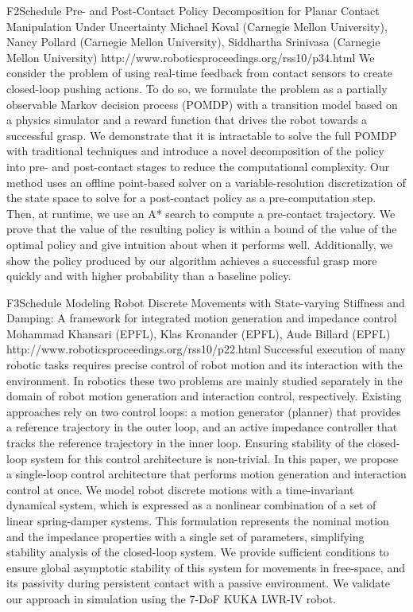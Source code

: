 \begin{spacing}{1.0}
\clearpage
\descriptionPaper
{F2}{Schedule}
{	
Pre- and Post-Contact Policy Decomposition for Planar Contact Manipulation Under Uncertainty 
}
{
Michael Koval (Carnegie Mellon University), Nancy Pollard (Carnegie Mellon University), Siddhartha Srinivasa (Carnegie Mellon University)
}
{
http://www.roboticsproceedings.org/rss10/p34.html
}
{
We consider the problem of using real-time feedback from contact sensors to create closed-loop pushing actions. To do so, we formulate the problem as a partially observable Markov decision process (POMDP) with a transition model based on a physics simulator and a reward function that drives the robot towards a successful grasp. We demonstrate that it is intractable to solve the full POMDP with traditional techniques and introduce a novel decomposition of the policy into pre- and post-contact stages to reduce the computational complexity. Our method uses an offline point-based solver on a variable-resolution discretization of the state space to solve for a post-contact policy as a pre-computation step. Then, at runtime, we use an A* search to compute a pre-contact trajectory. We prove that the value of the resulting policy is within a bound of the value of the optimal policy and give intuition about when it performs well. Additionally, we show the policy produced by our algorithm achieves a successful grasp more quickly and with higher probability than a baseline policy.
}





\descriptionPaper
{F3}{Schedule}
{	
Modeling Robot Discrete Movements with State-varying Stiffness and Damping: A framework for integrated motion generation and impedance control 
}
{
Mohammad Khansari (EPFL), Klas Kronander (EPFL), Aude Billard (EPFL)
}
{
http://www.roboticsproceedings.org/rss10/p22.html
}
{
Successful execution of many robotic tasks requires precise control of robot motion and its interaction with the environment. In robotics these two problems are mainly studied separately in the domain of robot motion generation and interaction control, respectively. Existing approaches rely on two control loops: a motion generator (planner) that provides a reference trajectory in the outer loop, and an active impedance controller that tracks the reference trajectory in the inner loop. Ensuring stability of the closed-loop system for this control architecture is non-trivial. In this paper, we propose a single-loop control architecture that performs motion generation and interaction control at once. We model robot discrete motions with a time-invariant dynamical system, which is expressed as a nonlinear combination of a set of linear spring-damper systems. This formulation represents the nominal motion and the impedance properties with a single set of parameters, simplifying stability analysis of the closed-loop system. We provide sufficient conditions to ensure global asymptotic stability of this system for movements in free-space, and its passivity during persistent contact with a passive environment. We validate our approach in simulation using the 7-DoF KUKA LWR-IV robot.
}




\end{spacing}
